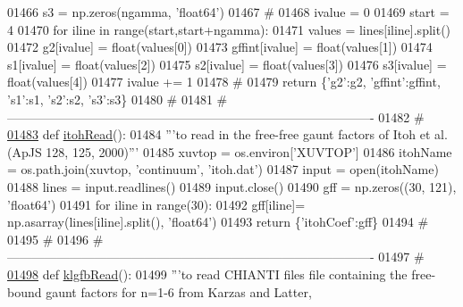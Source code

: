 \begin{DoxyCode}
{{{{{{{{{{{{{{01466     s3 = np.zeros(ngamma, \textcolor{stringliteral}{'float64'})
01467     \textcolor{comment}{#}
01468     ivalue = 0
01469     start = 4
01470     \textcolor{keywordflow}{for} iline \textcolor{keywordflow}{in} range(start,start+ngamma):
01471         values = lines[iline].split()
01472         g2[ivalue] = float(values[0])
01473         gffint[ivalue] = float(values[1])
01474         s1[ivalue] = float(values[2])
01475         s2[ivalue] = float(values[3])
01476         s3[ivalue] = float(values[4])
01477         ivalue += 1
01478     \textcolor{comment}{#}
01479     \textcolor{keywordflow}{return} \{\textcolor{stringliteral}{'g2'}:g2, \textcolor{stringliteral}{'gffint'}:gffint, \textcolor{stringliteral}{'s1'}:s1, \textcolor{stringliteral}{'s2'}:s2, \textcolor{stringliteral}{'s3'}:s3\}
01480     \textcolor{comment}{#}
01481     \textcolor{comment}{# ----------------------------------------------------------------------------------------}
01482     \textcolor{comment}{#}
\hypertarget{__chianti__tools_8py_source_l01483}{}\hyperlink{namespacepyneb_1_1utils_1_1__chianti__tools_a3dc5585b3508d8baf58ba62d0f728f16}{01483} \textcolor{keyword}{def }\hyperlink{namespacepyneb_1_1utils_1_1__chianti__tools_a3dc5585b3508d8baf58ba62d0f728f16}{itohRead}():
01484     \textcolor{stringliteral}{'''to read in the free-free gaunt factors of Itoh et al. (ApJS 128, 125, 2000)'''}
01485     xuvtop = os.environ[\textcolor{stringliteral}{'XUVTOP'}]
01486     itohName = os.path.join(xuvtop, \textcolor{stringliteral}{'continuum'}, \textcolor{stringliteral}{'itoh.dat'})
01487     input = open(itohName)
01488     lines = input.readlines()
01489     input.close()
01490     gff = np.zeros((30, 121), \textcolor{stringliteral}{'float64'})
01491     \textcolor{keywordflow}{for} iline \textcolor{keywordflow}{in} range(30):
01492         gff[iline]= np.asarray(lines[iline].split(), \textcolor{stringliteral}{'float64'})
01493     \textcolor{keywordflow}{return} \{\textcolor{stringliteral}{'itohCoef'}:gff\}
01494     \textcolor{comment}{#}
01495     \textcolor{comment}{#}
01496     \textcolor{comment}{# ----------------------------------------------------------------------------------------}
01497     \textcolor{comment}{#}
\hypertarget{__chianti__tools_8py_source_l01498}{}\hyperlink{namespacepyneb_1_1utils_1_1__chianti__tools_aa4cdc5fd04cf99d7600e480f0dc95ae4}{01498} \textcolor{keyword}{def }\hyperlink{namespacepyneb_1_1utils_1_1__chianti__tools_aa4cdc5fd04cf99d7600e480f0dc95ae4}{klgfbRead}():
01499     \textcolor{stringliteral}{'''to read CHIANTI files file containing the free-bound gaunt factors for n=1-6 from Karzas and Latter,
}}}}}}}}}}}}}}}
\end{DoxyCode}
